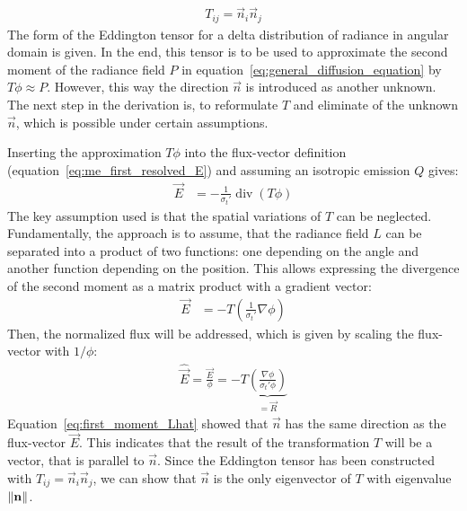\begin{align}
T_{ij} = \vec{n}_i\vec{n}_j
\label{eq:iso_delta_T}
\end{align}
The form of the Eddington tensor for a delta distribution of radiance in angular domain is given. In the end, this tensor is to be used to approximate the second moment of the radiance field $P$ in equation~\ref{eq:general_diffusion_equation} by $T\phi\approx P$. However, this way the direction $\vec{n}$ is introduced as another unknown. The next step in the derivation is, to reformulate $T$ and eliminate of the unknown $\vec{n}$, which is possible under certain assumptions.

Inserting the approximation $T\phi$ into the flux-vector definition (equation~\ref{eq:me_first_resolved_E}) and assuming an isotropic emission $Q$ gives:
\begin{align*}
\vec{E}&= -\frac{1}{\sigma_t'}\operatorname{div}\left (T\phi\right )
\end{align*}
The key assumption used is that the spatial variations of $T$ can be neglected. Fundamentally, the approach is to assume, that the radiance field $L$ can be separated into a product of two functions: one depending on the angle and another function depending on the position. This allows expressing the divergence of the second moment as a matrix product with a gradient vector:
\begin{align}
\vec{E}&= -T\left(\frac{1}{\sigma_t'}\nabla\phi\right )
\label{eq:second_moment_iso2}
\end{align}
Then, the normalized flux will be addressed, which is given by scaling the flux-vector with $1/\phi$:
\begin{align}
\widehat{\vec{E}} = \frac{\vec{E}}{\phi}= -T\underbrace{\left(\frac{\nabla\phi}{\sigma_t'\phi}\right )}_{=\vec{R}}
\label{eq:second_moment_iso3}
\end{align}
Equation~\ref{eq:first_moment_Lhat} showed that $\vec{n}$ has the same direction as the flux-vector $\vec{E}$. This indicates that the result of the transformation $T$ will be a vector, that is parallel to $\vec{n}$. Since the Eddington tensor has been constructed with $T_{ij}=\vec{n}_i\vec{n}_j$, we can show that $\vec{n}$ is the only eigenvector of $T$ with eigenvalue $\left\lVert\boldsymbol{\mathbf{n}}\right\rVert$.

